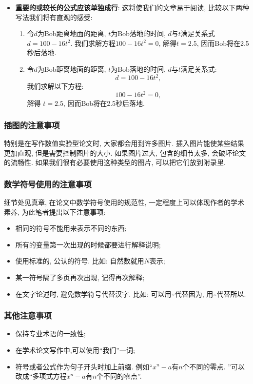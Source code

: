 \documentclass{formatBook}
\begin{document}
\begin{itemize}
    \item {\textbf{重要的或较长的公式应该单独成行}}: 这将使我们的文章易于阅读, 比较以下两种写法我们将有直观的感受:
          \begin{enumerate}
              \item 令$d$为Bob距离地面的距离, $t$为Bob落地的时间, $d$与$t$满足关系式$d = 100 − 16t^{2}$. 我们求解方程$100 − 16t^{2} = 0$, 解得$t =2.5$, 因而Bob将在2.5秒后落地.
              \item 令$d$为Bob距离地面的距离, $t$为Bob落地的时间, $d$与$t$满足关系式:
                    \begin{equation*}
                        d = 100 − 16t^{2},
                    \end{equation*}
                    我们求解以下方程:
                    \begin{equation*}
                        100 − 16t^{2} =0,
                    \end{equation*}
                    解得 $t =2.5$, 因而Bob将在2.5秒后落地.
          \end{enumerate}
\end{itemize}
\subsubsection{插图的注意事项}
特别是在写作数值实验型论文时, 大家都会用到许多图片. 插入图片能使某些结果更加直观, 但是需要控制图片的大小. 如果图片过大, 包含的细节太多, 会破坏论文的流畅性. 如果我们很有必要使用这种类型的图片, 可以把它们放到附录里.
\subsubsection{数学符号使用的注意事项}
细节处见真章{, 在论文中数学符号使用的规范性, 一定程度上可以体现作者的学术素养}, 为此笔者提出以下注意事项:
\begin{itemize}
    \item 相同的符号不能用来表示不同的东西{;}
    \item 所有的变量第一次出现的时候都要进行解释说明{;}
    \item 使用标准的, 公认的符号. 比如: 自然数就用$N$表示{;}
    \item 某一符号隔了多页再次出现, 记得再次解释{;}
    \item 在文字论述时, 避免数学符号代替汉字. 比如: 可以用$\because$代替因为, 用$\therefore$代替所以{.}
\end{itemize}
\subsubsection{其他注意事项}
\begin{itemize}
    \item {保持专业术语的一致性}{;}
    \item {在学术论文写作中,可以使用{``}我们''一词}{;}
    \item {符号或者公式作为句子开头时加上前缀.} 例如{``}$x^{n}-a$有$n$个不同的零点. ''可以改成{``}多项式方程$x^{n}-a$有$n$个不同的零点''{.}
\end{itemize}
\end{document}

